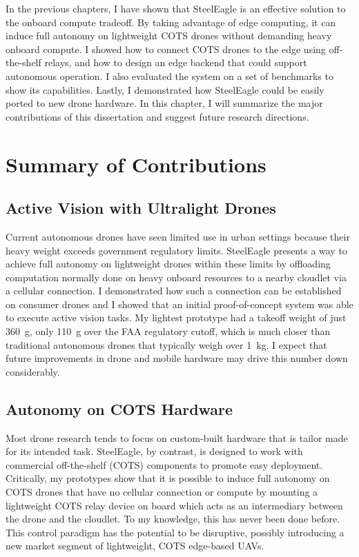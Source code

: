 In the previous chapters, I have shown that SteelEagle is an effective solution to the onboard compute tradeoff. By taking advantage of edge computing, it can induce full autonomy on lightweight COTS drones without demanding heavy onboard compute. I showed how to connect COTS drones to the edge using off-the-shelf relays, and how to design an edge backend that could support autonomous operation. I also evaluated the system on a set of benchmarks to show its capabilities. Lastly, I demonstrated how SteelEagle could be easily ported to new drone hardware. In this chapter, I will summarize the major contributions of this dissertation and suggest future research directions.

\section{Summary of Contributions}

\subsection{Active Vision with Ultralight Drones}
Current autonomous drones have seen limited use in urban settings because their heavy weight exceeds government regulatory limits. SteelEagle presents a way to achieve full autonomy on lightweight drones within these limits by offloading computation normally done on heavy onboard resources to a nearby cloudlet via a cellular connection. I demonstrated how such a connection can be established on consumer drones and I showed that an initial proof-of-concept system was able to execute active vision tasks. My lightest prototype had a takeoff weight of just 360~g, only 110~g over the FAA regulatory cutoff, which is much closer than traditional autonomous drones that typically weigh over 1~kg. I expect that future improvements in drone and mobile hardware may drive this number down considerably.

\subsection{Autonomy on COTS Hardware}
Most drone research tends to focus on custom-built hardware that is tailor made for its intended task. SteelEagle, by contrast, is designed to work with commercial off-the-shelf (COTS) components to promote easy deployment. Critically, my prototypes show that it is possible to induce full autonomy on COTS drones that have no cellular connection or compute by mounting a lightweight COTS relay device on board which acts as an intermediary between the drone and the cloudlet. To my knowledge, this has never been done before. This control paradigm has the potential to be disruptive, possibly introducing a new market segment of lightweight, COTS edge-based UAVs. 

